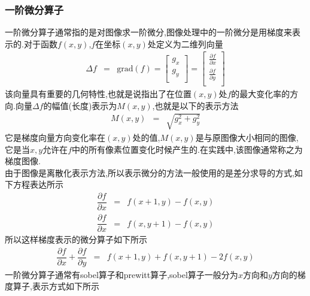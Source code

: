 \documentclass[UTF8,a4paper,10pt]{ctexart}
\begin{document}
\begin{flushleft}
        \subsubsection{一阶微分算子}
        \hspace{2em}一阶微分算子通常指的是对图像求一阶微分,图像处理中的一阶微分是用梯度来表示的.对于函数$f(x,y)$,$f$在坐标$(x,y)$处定义为二维列向量\\
        \begin{eqnarray}
            \Delta{f}&=&\text{grad}(f)=\left[\begin{array}{c}
                g_{x}\\
                g_{y}\\
            \end{array}\right]=\left[\begin{array}{c}
                \frac{\partial{f}}{\partial{x}}\\
                \frac{\partial{f}}{\partial{y}}\\
            \end{array}\right]\nonumber
        \end{eqnarray}
        \hspace{2em}该向量具有重要的几何特性,也就是说指出了在位置$(x,y)$处$f$的最大变化率的方向.向量$\Delta{f}$的幅值(长度)表示为$M(x,y)$,也就是以下的表示方法
        \begin{eqnarray}
            M(x,y)&=&\sqrt{g_{x}^{2}+g_{y}^{2}}\nonumber
        \end{eqnarray}
        \hspace{2em}它是梯度向量方向变化率在$(x,y)$处的值,$M(x,y)$是与原图像大小相同的图像,它是当$x,y$允许在$f$中的所有像素位置变化时候产生的.在实践中,该图像通常称之为梯度图像.\\
        \hspace{2em}由于图像是离散化表示方法,所以表示微分的方法一般使用的是差分求导的方式,如下方程表达所示
        \begin{eqnarray}
            \dfrac{\partial{f}}{\partial{x}}&=&f(x+1,y)-f(x,y)\nonumber\\
            \dfrac{\partial{f}}{\partial{x}}&=&f(x,y+1)-f(x,y)\nonumber
        \end{eqnarray}
        所以这样梯度表示的微分算子如下所示
        \begin{eqnarray}
            \dfrac{\partial{f}}{\partial{x}}+\dfrac{\partial{f}}{\partial{y}}&=&f(x+1,y)+f(x,y+1)-2f(x,y)\nonumber
        \end{eqnarray}
        \hspace{2em}一阶微分算子通常有sobel算子和prewitt算子,sobel算子一般分为$x$方向和$y$方向的梯度算子,表示方式如下所示

\end{flushleft}
\end{document}
